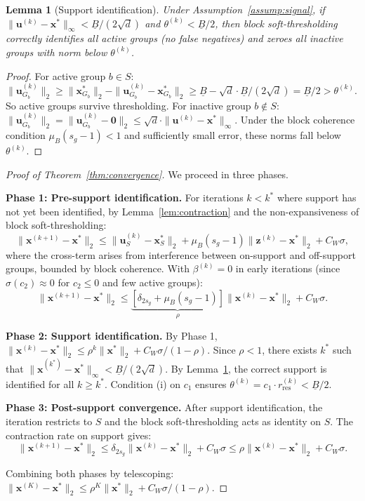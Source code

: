 \documentclass{article}
\newtheorem{lemma}{Lemma}
\begin{document}
\begin{lemma}[Support identification]
\label{lem:support}
Under Assumption~\ref{assump:signal}, if $\|\mathbf{u}^{(k)} - \mathbf{x}^*\|_\infty < \underline{B}/(2\sqrt{d})$ and $\theta^{(k)} < \underline{B}/2$, then block soft-thresholding correctly identifies all active groups (no false negatives) and zeroes all inactive groups with norm below $\theta^{(k)}$.
\end{lemma}
\begin{proof}
For active group $b \in S$: $\|\mathbf{u}^{(k)}_{G_b}\|_2 \geq \|\mathbf{x}^*_{G_b}\|_2 - \|\mathbf{u}^{(k)}_{G_b} - \mathbf{x}^*_{G_b}\|_2 \geq \underline{B} - \sqrt{d} \cdot \underline{B}/(2\sqrt{d}) = \underline{B}/2 > \theta^{(k)}$. So active groups survive thresholding. For inactive group $b \notin S$: $\|\mathbf{u}^{(k)}_{G_b}\|_2 = \|\mathbf{u}^{(k)}_{G_b} - \mathbf{0}\|_2 \leq \sqrt{d} \cdot \|\mathbf{u}^{(k)} - \mathbf{x}^*\|_\infty$. Under the block coherence condition $\mu_B(s_g-1) < 1$ and sufficiently small error, these norms fall below $\theta^{(k)}$.
\end{proof}

\begin{proof}[Proof of Theorem~\ref{thm:convergence}]
We proceed in three phases.

\textbf{Phase 1: Pre-support identification.} For iterations $k < k^*$ where support has not yet been identified, by Lemma~\ref{lem:contraction} and the non-expansiveness of block soft-thresholding:
\[
\|\mathbf{x}^{(k+1)} - \mathbf{x}^*\|_2 \leq \|\mathbf{u}^{(k)}_S - \mathbf{x}^*_S\|_2 + \mu_B(s_g - 1)\|\mathbf{z}^{(k)} - \mathbf{x}^*\|_2 + C_W\sigma,
\]
where the cross-term arises from interference between on-support and off-support groups, bounded by block coherence. With $\beta^{(k)} = 0$ in early iterations (since $\sigma(c_2) \approx 0$ for $c_2 \leq 0$ and few active groups):
\[
\|\mathbf{x}^{(k+1)} - \mathbf{x}^*\|_2 \leq \underbrace{[\delta_{2s_g} + \mu_B(s_g-1)]}_{\rho} \|\mathbf{x}^{(k)} - \mathbf{x}^*\|_2 + C_W\sigma.
\]

\textbf{Phase 2: Support identification.} By Phase 1, $\|\mathbf{x}^{(k)} - \mathbf{x}^*\|_2 \leq \rho^k \|\mathbf{x}^*\|_2 + C_W\sigma/(1-\rho)$. Since $\rho < 1$, there exists $k^*$ such that $\|\mathbf{x}^{(k^*)} - \mathbf{x}^*\|_\infty < \underline{B}/(2\sqrt{d})$. By Lemma~\ref{lem:support}, the correct support is identified for all $k \geq k^*$. Condition (i) on $c_1$ ensures $\theta^{(k)} = c_1 \cdot r^{(k)}_{\text{res}} < \underline{B}/2$.

\textbf{Phase 3: Post-support convergence.} After support identification, the iteration restricts to $S$ and the block soft-thresholding acts as identity on $S$. The contraction rate on support gives:
\[
\|\mathbf{x}^{(k+1)} - \mathbf{x}^*\|_2 \leq \delta_{2s_g}\|\mathbf{x}^{(k)} - \mathbf{x}^*\|_2 + C_W\sigma \leq \rho\|\mathbf{x}^{(k)} - \mathbf{x}^*\|_2 + C_W\sigma.
\]

Combining both phases by telescoping: $\|\mathbf{x}^{(K)} - \mathbf{x}^*\|_2 \leq \rho^K\|\mathbf{x}^*\|_2 + C_W\sigma/(1-\rho)$.
\end{proof}
\end{document}
